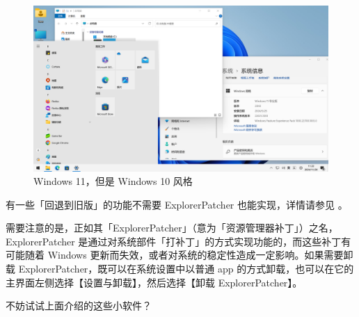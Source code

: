 \begin{figure}[htb!]
  \centering
  \includegraphics[width=.8\textwidth]{assets/software/EP_cosplay.png}
  \caption{Windows 11，但是 Windows 10 风格}
  \label{fig:EP_cosplay}
\end{figure}

\begin{note}
  有一些「回退到旧版」的功能不需要 ExplorerPatcher 也能实现，详情请参见 。
\end{note}

需要注意的是，正如其「ExplorerPatcher」（意为「资源管理器补丁」）之名，ExplorerPatcher 是通过对系统部件「打补丁」的方式实现功能的，而这些补丁有可能随着 Windows 更新而失效，或者对系统的稳定性造成一定影响。如果需要卸载 ExplorerPatcher，既可以在系统设置中以普通 app 的方式卸载，也可以在它的主界面左侧选择【设置与卸载】，然后选择【卸载 ExplorerPatcher】。

\practice

不妨试试上面介绍的这些小软件？